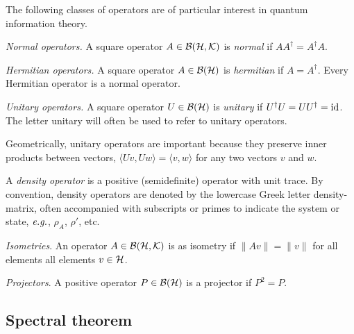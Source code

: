 The following classes of operators are of particular interest in quantum information theory.

\begin{definition}
  \emph{Normal operators.} A square operator $A \in \mathcal{B}(\mathcal{H},\mathcal{K})$ is \emph{normal} if $AA^{\dagger} = A^{\dagger}A$.
\end{definition}

\begin{definition} \label{def:hermitian}
  \emph{Hermitian operators.} A square operator $A \in \mathcal{B}(\mathcal{H})$ is \emph{hermitian}  if $A = A^{\dagger}$. Every Hermitian operator is a normal operator.
\end {definition}


\begin{definition}
  \emph{Unitary operators.} A square operator $U \in  \mathcal{B}(\mathcal{H})$ is \emph{unitary} if $U^{\dagger}U = UU^{\dagger} = \mathrm{id}$. The letter \gls{unitary} will often be used to refer to unitary
  operators.
\end{definition}
Geometrically, unitary operators are important because they preserve inner products between vectors, $\langle U v, U w \rangle = \langle v, w \rangle$  for any two vectors $v$ and $w$. 

\begin{definition} \label{def:density_op}
  A \emph{density operator} is a positive (semidefinite) operator with unit trace. By convention, density operators are denoted by the lowercase Greek letter \gls{density-matrix}, often accompanied with subscripts or primes to indicate the system or state, $\emph{e.g.}$, $\rho_A$, $\rho'$, etc.
\end{definition}

\begin{definition}
  \emph{Isometries}. An operator $A \in \mathcal{B}(\mathcal{H},\mathcal{K} )$ is as isometry if $\|Av\| = \|v\|$ for all elements all elements $v \in \mathcal{H} $.
\end{definition}

\begin{definition}
  \emph{Projectors}. A positive operator $P \in \mathcal{B}(\mathcal{H})$ is a projector if $P^2 = P$.
\end{definition}







\subsection{Spectral theorem}

